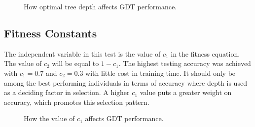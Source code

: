 \documentclass[12pt]{article}
\begin{document}
\begin{figure}[H]
    \centering
    \caption{How optimal tree depth affects GDT performance.}
\end{figure}

\subsection{Fitness Constants}

The independent variable in this test is the value of $c_1$ in the fitness equation. The value of $c_2$ will be equal to $1 - c_1$. The highest testing accuracy was achieved with $c_1 = 0.7$ and $c_2 = 0.3$ with little cost in training time. It should only be among the best performing individuals in terms of accuracy where depth is used as a deciding factor in selection. A higher $c_1$ value puts a greater weight on accuracy, which promotes this selection pattern.

\begin{figure}[H]
    \centering
    \caption{How the value of $c_1$ affects GDT performance.}
\end{figure}
\end{document}
